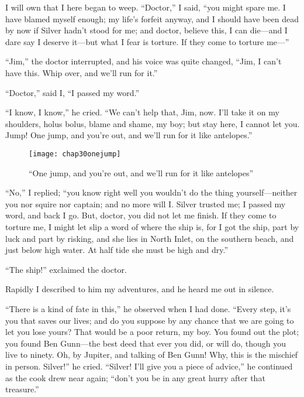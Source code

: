 I will own that I here began to weep. \enquote{Doctor,} I said, \enquote{you might spare me. I have blamed myself enough; my life’s forfeit anyway, and I should have been dead by now if Silver hadn’t stood for me; and doctor, believe this, I can die---and I dare say I deserve it---but what I fear is torture. If they come to torture me---}

\enquote{Jim,} the doctor interrupted, and his voice was quite changed, \enquote{Jim, I can’t have this. Whip over, and we’ll run for it.}

\enquote{Doctor,} said I, \enquote{I passed my word.}

\enquote{I know, I know,} he cried. \enquote{We can’t help that, Jim, now. I’ll take it on my shoulders, holus bolus, blame and shame, my boy; but stay here, I cannot let you. Jump! One jump, and you’re out, and we’ll run for it like antelopes.}

\begin{figure}[p]
\centering
\texttt{[image: chap30onejump]}
\caption[\enquote{One jump, and we’ll run for it}]{\enquote{One jump, and you’re out, and we’ll run for it like antelopes}}
\end{figure}  

\enquote{No,} I replied; \enquote{you know right well you wouldn’t do the thing yourself---neither you nor squire nor captain; and no more will I. Silver trusted me; I passed my word, and back I go. But, doctor, you did not let me finish. If they come to torture me, I might let slip a word of where the ship is, for I got the ship, part by luck and part by risking, and she lies in North Inlet, on the southern beach, and just below high water. At half tide she must be high and dry.}

\enquote{The ship!} exclaimed the doctor.

Rapidly I described to him my adventures, and he heard me out in silence.

\enquote{There is a kind of fate in this,} he observed when I had done. \enquote{Every step, it’s you that saves our lives; and do you suppose by any chance that we are going to let you lose yours? That would be a poor return, my boy. You found out the plot; you found Ben Gunn---the best deed that ever you did, or will do, though you live to ninety. Oh, by Jupiter, and talking of Ben Gunn! Why, this is the mischief in person. Silver!} he cried. \enquote{Silver! I’ll give you a piece of advice,} he continued as the cook drew near again; \enquote{don’t you be in any great hurry after that treasure.}

